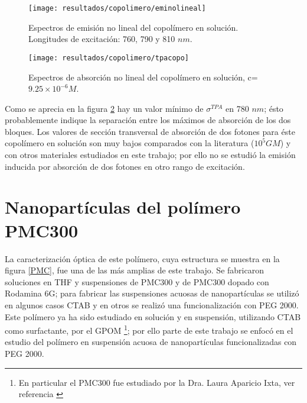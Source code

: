 \begin{figure}[h]
\centering
\texttt{[image: resultados/copolimero/eminolineal]}
\caption{Espectros de emisi\'on no lineal del copol\'imero en soluci\'on. Longitudes de excitaci\'on: 760, 790 y 810 $nm$.}\label{nolinealejemplos}
\end{figure}



\begin{figure}[H]
\centering
\texttt{[image: resultados/copolimero/tpacopo]}
\caption{Espectros de absorci\'on no lineal del copol\'imero en soluci\'on, c=$9.25 \times 10 ^{-6} M$.}\label{sigmacopo}
\end{figure}

Como se aprecia en la figura \ref{sigmacopo} hay un valor m\'inimo de $\sigma ^{TPA}$ en 780 $nm$; \'esto probablemente indique la separaci\'on entre los m\'aximos de absorci\'on de los dos bloques. Los valores de secci\'on transversal de absorci\'on de dos fotones para \'este copol\'imero en soluci\'on son muy bajos comparados con la literatura ($10^5 GM$) y con otros materiales estudiados en este trabajo; por ello no se estudi\'o la emisi\'on inducida por absorci\'on de dos fotones en otro rango de excitaci\'on. 
 
 



\section{Nanopart\'iculas del pol\'imero PMC300} 

La caracterizaci\'on \'optica de este pol\'imero, cuya estructura se muestra en la figura \ref{PMC}, fue una de las m\'as amplias de este trabajo. Se fabricaron soluciones en THF y suspensiones de PMC300 y de PMC300 dopado con Rodamina 6G; para fabricar las suspensiones acuosas de nanopart\'iculas se utiliz\'o en algunos casos CTAB y en otros se realiz\'o una funcionalizaci\'on con PEG 2000. Este pol\'imero ya ha sido estudiado en soluci\'on y en suspensi\'on, utilizando CTAB como surfactante, por el GPOM \footnote{En particular el PMC300 fue estudiado por la Dra. Laura Aparicio Ixta, ver referencia \cite{laurita}}; por ello parte de este trabajo se enfoc\'o en el estudio del pol\'imero en suspensi\'on acuosa de nanopart\'iculas funcionalizadas con PEG 2000.

